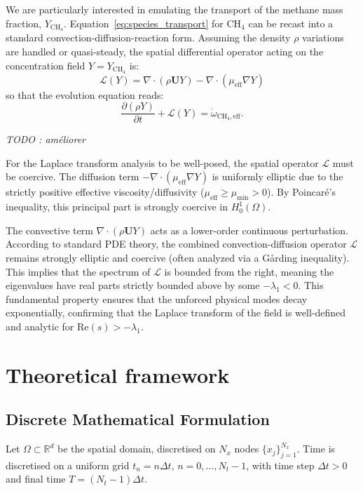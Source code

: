 \documentclass[11pt, a4paper]{article}
\newcommand{\R}{\mathbb{R}}
\begin{document}
We are particularly interested in emulating the transport of the methane mass fraction, $Y_{\mathrm{CH}_4}$. Equation~\eqref{eq:species_transport} for CH$_4$ can be recast into a standard convection-diffusion-reaction form. Assuming the density $\rho$ variations are handled or quasi-steady, the spatial differential operator acting on the concentration field $Y = Y_{\mathrm{CH}_4}$ is:
\begin{equation}
    \mathcal{L}(Y) = \nabla \cdot (\rho \mathbf{U} Y) - \nabla \cdot (\mu_{\mathrm{eff}} \nabla Y)
\end{equation}
so that the evolution equation reads:
\begin{equation}
    \frac{\partial (\rho Y)}{\partial t} + \mathcal{L}(Y) = \dot{\omega}_{\mathrm{CH}_4, \mathrm{eff}}.
\end{equation}

\emph{TODO : améliorer}

For the Laplace transform analysis to be well-posed, the spatial operator $\mathcal{L}$ must be coercive. The diffusion term $-\nabla \cdot (\mu_{\mathrm{eff}} \nabla Y)$ is uniformly elliptic due to the strictly positive effective viscosity/diffusivity ($\mu_{\mathrm{eff}} \geq \mu_{\min} > 0$). By Poincaré's inequality, this principal part is strongly coercive in $H_0^1(\Omega)$. 

The convective term $\nabla \cdot (\rho \mathbf{U} Y)$ acts as a lower-order continuous perturbation. According to standard PDE theory, the combined convection-diffusion operator $\mathcal{L}$ remains strongly elliptic and coercive (often analyzed via a Gårding inequality). This implies that the spectrum of $\mathcal{L}$ is bounded from the right, meaning the eigenvalues have real parts strictly bounded above by some $-\lambda_1 < 0$. This fundamental property ensures that the unforced physical modes decay exponentially, confirming that the Laplace transform of the field is well-defined and analytic for $\mathrm{Re}(s) > -\lambda_1$.

\section{Theoretical framework}

\subsection{Discrete Mathematical Formulation}

Let $\Omega \subset \R^d$ be the spatial domain, discretised on $N_x$ nodes
$\{x_j\}_{j=1}^{N_x}$.
Time is discretised on a uniform grid $t_n = n\Delta t$, $n = 0,\ldots,N_t-1$,
with time step $\Delta t > 0$ and final time $T = (N_t-1)\Delta t$.
\end{document}
